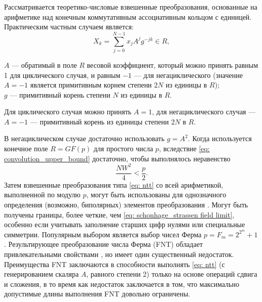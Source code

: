 Рассматривается теоретико-числовые взвешенные преобразования, основанные на арифметике над конечным коммутативным ассоциативным кольцом с единицей.
Практическим частным случаем является:
\begin{equation}\label{eq: ntt}
X_k = \sum_{j=0}^{N-1} x_j A^j g^{-j k} \in R,
\end{equation}
\begin{whereblock}
	$A$ --- обратимый в поле $R$ весовой коэффициент, который можно принять равным 1 для циклического случая, и равным $-1$ --- для негациклического (значение $A=-1$ является примитивным корнем степени $2 N$ из единицы в $R$);\\
	$g$ --- примитивный корень степени $N$ из единицы в $R$.
\end{whereblock}

Для циклического случая можно принять $A=1$, для негациклического случая --- $A=-1$ --- примитивный корень из единицы степени $2 N$ в $R$.

В негациклическом случае достаточно использовать $g = A^2$.
Когда используется конечное поле $R=GF(p)$ для простого числа $p$, вследствие \eqref{eq: convolution_upper_bound} достаточно, чтобы выполнялось неравенство
\begin{equation}\label{eq: schonhage_strassen field limit}
\frac{N W^2}{4} < \frac{p}{2}.
\end{equation}
Затем взвешенные преобразования типа \eqref{eq: ntt} со всей арифметикой, выполненной по модулю $p$, могут быть использованы для однозначного определения (возможно, биполярных) элементов преобразования \cite{loop-ntt}.
Могут быть получены границы, более четкие, чем \eqref{eq: schonhage_strassen field limit}, особенно если учитывать заполнение старших цифр нулями или специальные симметрии.
Популярным выбором является выбор чисел Ферма $p = F_m = 2^{2^m} + 1$.
Результирующее преобразование числа Ферма (FNT) обладает привлекательными свойствами \cite{ArithmeticsForFNT}, но имеет один существенный недостаток.
Преимущества FNT заключаются в способности выполнять \eqref{eq: ntt} (с генерированием скаляра $A$, равного степени 2) только на основе операций сдвига и сложения, в то время как недостаток заключается в том, что максимально допустимые длины выполнения FNT довольно ограничены.

